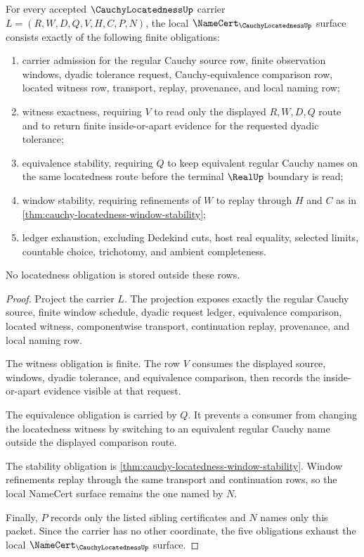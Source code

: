 \begin{theorem}
\label{thm:cauchy-locatedness-namecert-obligation}
For every accepted $\CauchyLocatednessUp$ carrier $L=(R,W,D,Q,V,H,C,P,N)$, the local $\NameCert_{\CauchyLocatednessUp}$ surface consists exactly of the following finite obligations:
\begin{enumerate}
\item carrier admission for the regular Cauchy source row, finite observation windows, dyadic tolerance request, Cauchy-equivalence comparison row, located witness row, transport, replay, provenance, and local naming row;
\item witness exactness, requiring $V$ to read only the displayed $R,W,D,Q$ route and to return finite inside-or-apart evidence for the requested dyadic tolerance;
\item equivalence stability, requiring $Q$ to keep equivalent regular Cauchy names on the same locatedness route before the terminal $\RealUp$ boundary is read;
\item window stability, requiring refinements of $W$ to replay through $H$ and $C$ as in \autoref{thm:cauchy-locatedness-window-stability};
\item ledger exhaustion, excluding Dedekind cuts, host real equality, selected limits, countable choice, trichotomy, and ambient completeness.
\end{enumerate}
No locatedness obligation is stored outside these rows.
\end{theorem}
\begin{proof}
Project the carrier $L$. The projection exposes exactly the regular Cauchy source, finite window schedule, dyadic request ledger, equivalence comparison, located witness, componentwise transport, continuation replay, provenance, and local naming row.

The witness obligation is finite. The row $V$ consumes the displayed source, windows, dyadic tolerance, and equivalence comparison, then records the inside-or-apart evidence visible at that request.

The equivalence obligation is carried by $Q$. It prevents a consumer from changing the locatedness witness by switching to an equivalent regular Cauchy name outside the displayed comparison route.

The stability obligation is \autoref{thm:cauchy-locatedness-window-stability}. Window refinements replay through the same transport and continuation rows, so the local NameCert surface remains the one named by $N$.

Finally, $P$ records only the listed sibling certificates and $N$ names only this packet. Since the carrier has no other coordinate, the five obligations exhaust the local $\NameCert_{\CauchyLocatednessUp}$ surface.
\end{proof}

